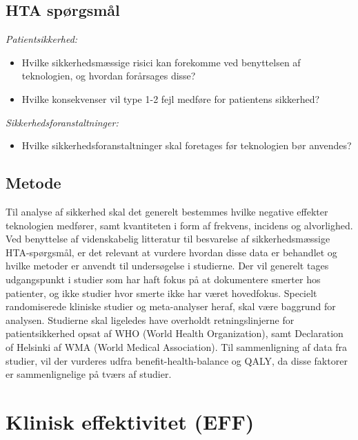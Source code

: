 \subsection{HTA spørgsmål} %

\textit{Patientsikkerhed:}
\begin{itemize}
	\item Hvilke sikkerhedsmæssige risici kan forekomme ved benyttelsen af teknologien, og hvordan forårsages disse? %
	\item Hvilke konsekvenser vil type 1-2 fejl medføre for patientens sikkerhed? %
\end{itemize}
\textit{Sikkerhedsforanstaltninger:}
\begin{itemize}
	\item Hvilke sikkerhedsforanstaltninger skal foretages før teknologien bør anvendes?  %
\end{itemize}

\subsection{Metode \citep{HTAcore}} %
Til analyse af sikkerhed skal det generelt bestemmes hvilke negative effekter teknologien medfører, samt kvantiteten i form af frekvens, incidens og alvorlighed. Ved benyttelse af videnskabelig litteratur til besvarelse af sikkerhedsmæssige HTA-spørgsmål, er det relevant at vurdere hvordan disse data er behandlet og hvilke metoder er anvendt til undersøgelse i studierne. Der vil generelt tages udgangspunkt i studier som har haft fokus på at dokumentere smerter hos patienter, og ikke studier hvor smerte ikke har været hovedfokus. Specielt randomiserede kliniske studier og meta-analyser heraf, skal være baggrund for analysen. Studierne skal ligeledes have overholdt retningslinjerne for patientsikkerhed opsat af WHO (World Health Organization), samt Declaration of Helsinki af WMA (World Medical Association). 
Til sammenligning af data fra studier, vil der vurderes udfra benefit-health-balance og QALY, da disse faktorer er sammenlignelige på tværs af studier. 

\section{Klinisk effektivitet (EFF)}
